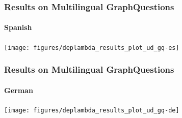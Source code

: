 \documentclass[mathserif,12pt]{beamer}
\begin{document}
\begin{frame}
\end{frame}

\begin{frame}
\frametitle{Results on Multilingual GraphQuestions}
\framesubtitle{Spanish}
\centering
\large
\vspace{0.4em}
\texttt{[image: figures/deplambda\_results\_plot\_ud\_gq-es]}
\end{frame}

\begin{frame}
\frametitle{Results on Multilingual GraphQuestions}
\framesubtitle{German}
\centering
\large
\vspace{0.4em}
\texttt{[image: figures/deplambda\_results\_plot\_ud\_gq-de]}
\end{frame}
\end{document}

